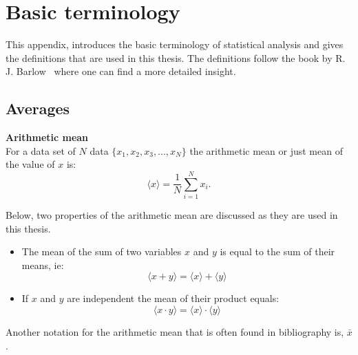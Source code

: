 \section{Basic terminology}\label{app:statistics_definitions}
This appendix, introduces the basic terminology of statistical analysis and gives the definitions that are used in this thesis. The definitions follow the book by R. J. Barlow~\cite{lvp.b313005720130101} where one can find a more detailed insight.

\subsection{Averages}
\normalsize{\textbf{Arithmetic mean}}\\
For a data set of $N$ data $\{ x_1, x_2, x_3, ..., x_N \}$ the arithmetic mean or just mean of the value of $x$ is:
\begin{equation}\label{eq:mean_def}
    \langle x \rangle = \frac{1}{N} \sum_{i=1}^{N} x_i.
\end{equation}

Below, two properties of the arithmetic mean are discussed as they are used in this thesis.
\begin{itemize}
    \item The mean of the sum of two variables $x$ and $y$ is equal to the sum of their means, ie:
    \begin{equation}\label{eq:mean_of_sum_property}
        \langle x+y \rangle = \langle x \rangle + \langle y \rangle
    \end{equation}
    \item If $x$ and $y$ are independent the mean of their product equals:
    \begin{equation}\label{eq:mean_of_product_property}
        \langle x \cdot y \rangle = \langle x \rangle \cdot  \langle y \rangle
    \end{equation}
\end{itemize}

Another notation for the arithmetic mean that is often found in bibliography is, $\bar{x}$. 


